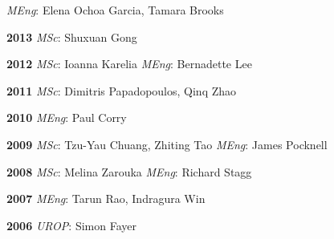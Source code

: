 \documentclass[margin]{res}
\begin{document}
\begin{resume}
			{}
		\textit{MEng}: Elena Ochoa Garcia, Tamara Brooks 
	\par
	\parskip=0in
	\hangindent=0.45in
	{\bf2013 }
		\textit{MSc}: Shuxuan Gong 
	\par
	\parskip=0in
	\hangindent=0.45in
	{\bf2012 }
		\textit{MSc}: Ioanna Karelia 
			{}
		\textit{MEng}: Bernadette Lee 
	\par
	\parskip=0in
	\hangindent=0.45in
	{\bf2011 }
		\textit{MSc}: Dimitris Papadopoulos, Qinq Zhao 
	\par
	\parskip=0in
	\hangindent=0.45in
	{\bf2010 }
		\textit{MEng}: Paul Corry 
	\par
	\parskip=0in
	\hangindent=0.45in
	{\bf2009 }
		\textit{MSc}: Tzu-Yau Chuang, Zhiting Tao 
			{}
		\textit{MEng}: James Pocknell 
	\par
	\parskip=0in
	\hangindent=0.45in
	{\bf2008 }
		\textit{MSc}: Melina Zarouka 
			{}
		\textit{MEng}: Richard Stagg 
	\par
	\parskip=0in
	\hangindent=0.45in
	{\bf2007 }
		\textit{MEng}: Tarun Rao, Indragura Win 
	\par
	\parskip=0in
	\hangindent=0.45in
	{\bf2006 }
		\textit{UROP}: Simon Fayer 
	\par


\end{resume}
\end{document}
